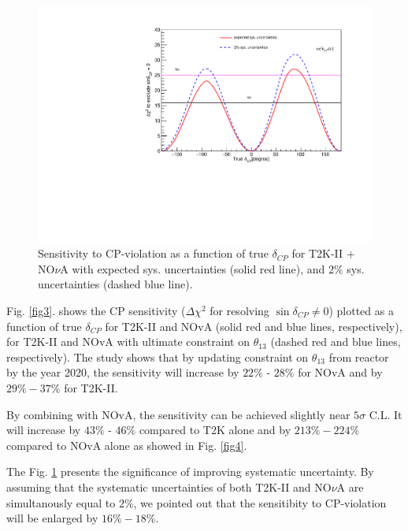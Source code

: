 \documentclass[a4 paper,12pt]{report}%
\begin{document}
  \begin{figure}
 	\centering
 	\includegraphics[scale=0.5]{improve_sys.pdf} 
 	\caption{\label{fig5} Sensitivity to CP-violation as a function of true $\delta_{CP}$ for T2K-II + NO$\nu$A with expected sys. uncertainties (solid red line), and $2\%$ sys. uncertainties (dashed blue line).} 
 \end{figure}


Fig. \ref{fig3}. shows the CP sensitivity ($\Delta \chi^2$ for resolving $\sin\delta_{CP}\not = 0$) plotted as a function of true $\delta_{CP}$ for T2K-II and NOvA (solid red and blue lines, respectively), for T2K-II and NOvA with ultimate constraint on $\theta_{13}$ (dashed red and blue lines, respectively). The study shows that by updating constraint on $\theta_{13}$ from reactor by the year 2020, the sensitivity will increase by $22\%$ - $28\%$ for NOvA and by $29\% - 37\%$ for T2K-II. \par 

By combining with NOvA, the sensitivity can be achieved slightly near $5\sigma$ C.L. It will increase by $43\%$ - $46\%$ compared to T2K alone and by $213\% - 224\%$ compared to NOvA alone as showed in Fig. \ref{fig4}. \par 

The Fig. \ref{fig5} presents the significance of improving systematic uncertainty. By assuming that the systematic uncertainties of both T2K-II and NO$\nu$A are simultanously equal to $2\%$, we pointed out that the sensitibity to CP-violation will be enlarged by $16\% - 18\%$.
\end{document}
